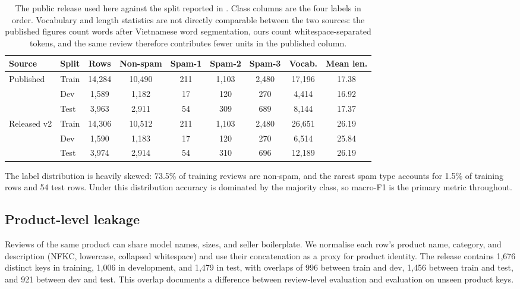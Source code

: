 \documentclass[12pt,a4paper]{article}
\begin{document}
\begin{table}[t]
\caption{The public release used here against the split reported in \cite{vispam2024}. Class columns are the four labels in order. Vocabulary and length statistics are not directly comparable between the two sources: the published figures count words after Vietnamese word segmentation, ours count whitespace-separated tokens, and the same review therefore contributes fewer units in the published column.}
\label{tab:data}
\centering
\small
\ifdefined\JCCSubmission
\setlength{\tabcolsep}{2.5pt}
\fi
\begin{tabular}{@{}llccccccc@{}}
\toprule
Source & Split & Rows & Non-spam & Spam-1 & Spam-2 & Spam-3 & Vocab. & Mean len. \\
\midrule
Published \cite{vispam2024} & Train & 14{,}284 & 10{,}490 & 211 & 1{,}103 & 2{,}480 & 17{,}196 & 17.38 \\
 & Dev & 1{,}589 & 1{,}182 & 17 & 120 & 270 & 4{,}414 & 16.92 \\
 & Test & 3{,}963 & 2{,}911 & 54 & 309 & 689 & 8{,}144 & 17.37 \\
\midrule
Released v2 & Train & 14{,}306 & 10{,}512 & 211 & 1{,}103 & 2{,}480 & 26{,}651 & 26.19 \\
 & Dev & 1{,}590 & 1{,}183 & 17 & 120 & 270 & 6{,}514 & 25.84 \\
 & Test & 3{,}974 & 2{,}914 & 54 & 310 & 696 & 12{,}189 & 26.19 \\
\bottomrule
\end{tabular}
\end{table}

The label distribution is heavily skewed: 73.5\% of training reviews are non-spam, and the rarest spam type accounts for 1.5\% of training rows and 54 test rows. Under this distribution accuracy is dominated by the majority class, so macro-F1 is the primary metric throughout.

\subsection{Product-level leakage}
Reviews of the same product can share model names, sizes, and seller boilerplate. We normalise each row's product name, category, and description (NFKC, lowercase, collapsed whitespace) and use their concatenation as a proxy for product identity. The release contains 1{,}676 distinct keys in training, 1{,}006 in development, and 1{,}479 in test, with overlaps of 996 between train and dev, 1{,}456 between train and test, and 921 between dev and test. This overlap documents a difference between review-level evaluation and evaluation on unseen product keys.
\end{document}
